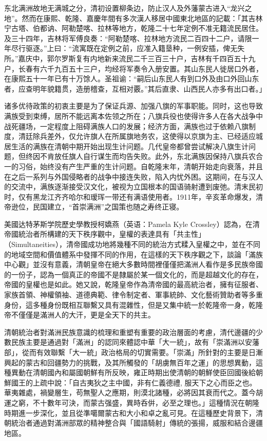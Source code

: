 东北满洲故地无满城之分，清初设置柳条边，防止汉人及外藩蒙古进入“龙兴之地”。然而在康熙、乾隆、嘉慶年間有多次漢人移居中國東北地區的記載：「其吉林宁古塔、伯都讷、阿勒楚喀、拉林等地方，乾隆二十七年定例不准无籍流民居住。及三十四年，吉林将军傅良奏：“阿勒楚喀、拉林地方流民二百四十二户，请限一年尽行驱逐。”上曰：“流寓既在定例之前，应准入籍垦种，一例安插，俾无失所。”嘉庆中，郭尔罗斯复有内地新来流民二千三百三十户，吉林有千四百五十九户，长春有六千九百五十三户，均经将军奏令入册安置。其山东民人徙居口外者，在康熙五十一年已有十万馀人。圣祖谕：“嗣后山东民人有到口外及由口外回山东者，应查明年貌籍贯，造册稽查，互相对覈。”其后直隶、山西民人亦多有出口者。」

诸多优待政策的初衷主要是为了保证兵源、加强八旗的军事职能。同时，这也导致满族受到束缚，居所不能远离本佐领之所在；八旗兵役也使得许多人在各大战争中战死疆场，一定程度上阻碍满族人口的发展；经济方面，满族也过于依赖八旗制度，清廷除兵差外，仅允许旗人在所属旗地务农，这使得以京旗为主、已经适应城居生活的满族在清朝中期开始出现生计问题。几代皇帝都曾尝试解决八旗生计问题，但终因不肯放任旗人自行谋生而均告失败。此外，东北满族因保持八旗兵农合一的习俗，始终没有产生严重的生计问题。自乾隆末年，清朝开始走向衰落，并且在之后一系列与外国侵略者的战争中接连失败，陷入内忧外困。这期间，在与汉人的交流中，满族逐渐接受汉文化，被视为立国根本的国语骑射遭到废弛。清末民初时，仅有黑龙江齐齐哈尔和瑷珲一带还有满语使用者。1911年，辛亥革命爆发，清帝逊位，民国建立，“首崇满洲”之国策也随之寿终正寝。

美國达特茅斯学院歷史學教授柯嬌燕（英语：Pamela Kyle Crossley）認為，在清帝國統治者所構建的天下秩序觀中，皇權的表達具有「共主性」（Simultaneities），清帝國成功地將幾種不同的統治方式糅入皇權之中，並在不同的地域空間和價值體系中發揮不同的作用，在這樣的天下秩序觀之下，談論「滿族中心觀」並沒有意義，清朝皇帝在絕大多數時間裡僅僅把滿洲人看作是多民族帝國的一份子，認為一個真正的帝國不是隸屬於某一個文化的，而是超越文化的存在，帝國的皇權也是如此。她又說，乾隆皇帝作為清帝國的最高統治者，擁有征服者、家族首領、神權領袖、道德典範、律令制定者、軍事統帥、文化藝術贊助者等多重身份，這多種身份既相互聯繫又具有混雜性，但是又集中統一於乾隆帝一身，乾隆帝不僅僅是滿洲人的大汗，更是全天下的共主。

清朝統治者對滿洲民族意識的梳理和重塑有重要的政治層面的考慮，清代邊疆的少數民族主要是通過對「滿洲」的認同來體認中華「大一統」，故有「崇滿洲以安藩部」，從而有效聯繫「大一統」政治格局的切實需要。「崇滿」所針對的主要是日漸興起的蒙古和回疆勢力的挑戰，及其所觸發的「胡虜無百年之運」的思想異動，這種異動在清朝國內和屬國朝鮮有所反映，雍正時期出使清朝的朝鮮使臣回國後給朝鮮國王的上疏中說：「自古夷狄之主中國，非有仁義德禮, 服天下之心而臣之也。華夷雜處，禍變層生，苟無聖人之應期，則漠北諸種，必將因其衰而代之。蓋今胡運之窮，不十數年可決，而蒙古强盛，異時呑倂，必至之理也。」這種情況在朝隆時期進一步深化，並且從準噶爾蒙古和大小和卓之亂可見。在這種歷史背景下，清朝統治者通過對滿洲部眾的精神整合與「國語騎射」傳統的張揚，威服和結合邊疆地區。

